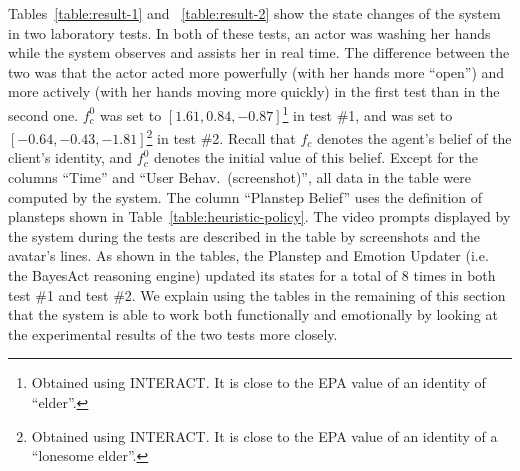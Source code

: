 Tables~\ref{table:result-1} and ~\ref{table:result-2} show the state changes of the system in two laboratory tests. In both of these tests, an actor was washing her hands while the system observes and assists her in real time. The difference between the two was that the actor acted more powerfully (with her hands more ``open'') and more actively (with her hands moving more quickly) in the first test than in the second one. $f_c^0$ was set to $[1.61, 0.84, -0.87]$\footnote{Obtained using INTERACT. It is close to the EPA value of an identity of ``elder''.} in test \#1, and was set to $[-0.64, -0.43, -1.81]$\footnote{Obtained using INTERACT. It is close to the EPA value of an identity of a ``lonesome elder''.} in test \#2. Recall that $f_c$ denotes the agent's belief of the client's identity, and $f_c^0$ denotes the initial value of this belief. Except for the columns ``Time'' and ``User Behav.~(screenshot)'', all data in the table were computed by the system. The column ``Planstep Belief'' uses the definition of plansteps shown in Table~\ref{table:heuristic-policy}. The video prompts displayed by the system during the tests are described in the table by screenshots and the avatar's lines. As shown in the tables, the Planstep and Emotion Updater (i.e. the BayesAct reasoning engine) updated its states for a total of 8 times in both test \#1 and test \#2. We explain using the tables in the remaining of this section that the system is able to work both functionally and emotionally by looking at the experimental results of the two tests more closely.

%

